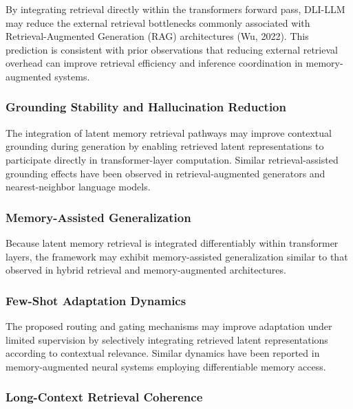 \documentclass[
]{article}
\begin{document}
By integrating retrieval directly within the
transformer\textquotesingle s forward pass, DLI-LLM may reduce the
external retrieval bottlenecks commonly associated with
Retrieval-Augmented Generation (RAG) architectures (Wu, 2022). This
prediction is consistent with prior observations that reducing external
retrieval overhead can improve retrieval efficiency and inference
coordination in memory-augmented systems.

\hypertarget{grounding-stability-and-hallucination-reduction}{%
\subsubsection{Grounding Stability and Hallucination
Reduction}\label{grounding-stability-and-hallucination-reduction}}

The integration of latent memory retrieval pathways may improve
contextual grounding during generation by enabling retrieved latent
representations to participate directly in transformer-layer
computation. Similar retrieval-assisted grounding effects have been
observed in retrieval-augmented generators and nearest-neighbor language
models.

\hypertarget{memory-assisted-generalization}{%
\subsubsection{Memory-Assisted
Generalization}\label{memory-assisted-generalization}}

Because latent memory retrieval is integrated differentiably within
transformer layers, the framework may exhibit memory-assisted
generalization similar to that observed in hybrid retrieval and
memory-augmented architectures.

\hypertarget{few-shot-adaptation-dynamics}{%
\subsubsection{Few-Shot Adaptation
Dynamics}\label{few-shot-adaptation-dynamics}}

The proposed routing and gating mechanisms may improve adaptation under
limited supervision by selectively integrating retrieved latent
representations according to contextual relevance. Similar dynamics have
been reported in memory-augmented neural systems employing
differentiable memory access.

\hypertarget{long-context-retrieval-coherence}{%
\subsubsection{Long-Context Retrieval
Coherence}\label{long-context-retrieval-coherence}}
\end{document}
